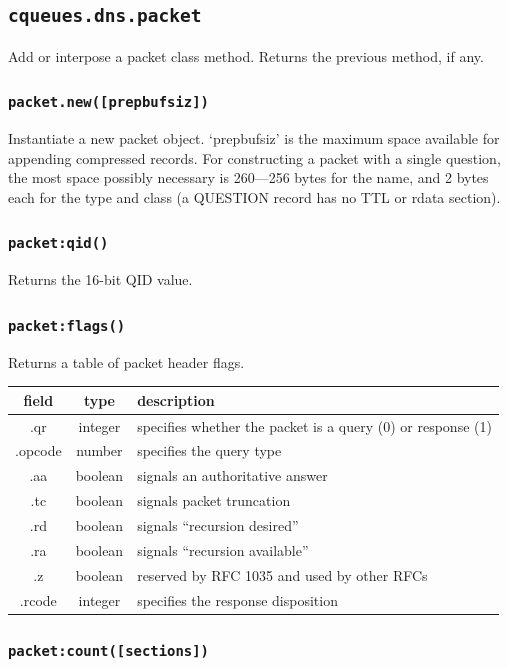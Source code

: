 \documentclass[11pt, oneside]{memoir}
\newcommand*{\fn}[1]{\texttt{#1}\xspace}
\newcounter{toccols}
\newenvironment{Module}[1]{
	\subsection{\texttt{#1}}
	\addtocontents{toc}{
		\protect\begin{multicols}{\value{toccols}}
	}
}{
	\addtocontents{toc}{\protect\end{multicols}}
}
\begin{document}
\begin{Module}{cqueues.dns.packet}
Add or interpose a packet class method. Returns the previous method, if any.

\subsubsection[\fn{packet.new}]{\fn{packet.new([prepbufsiz])}}

Instantiate a new packet object. `prepbufsiz' is the maximum space available for appending compressed records. For constructing a packet with a single question, the most space possibly necessary is 260---256 bytes for the name, and 2 bytes each for the type and class (a QUESTION record has no TTL or rdata section).

\subsubsection[\fn{packet:qid}]{\fn{packet:qid()}}

Returns the 16-bit QID value.

\subsubsection[\fn{packet:flags}]{\fn{packet:flags()}}

Returns a table of packet header flags.

\begin{tabular}{ c | c | l }
field & type & description\\\hline
.qr & integer & specifies whether the packet is a query (0) or response (1)\\
.opcode & number & specifies the query type\\
.aa & boolean & signals an authoritative answer\\
.tc & boolean & signals packet truncation\\
.rd & boolean & signals ``recursion desired''\\
.ra & boolean & signals ``recursion available''\\
.z & boolean & reserved by RFC 1035 and used by other RFCs\\
.rcode & integer & specifies the response disposition
\end{tabular}

\subsubsection[\fn{packet:count}]{\fn{packet:count([sections])}}


\end{Module}
\end{document}

